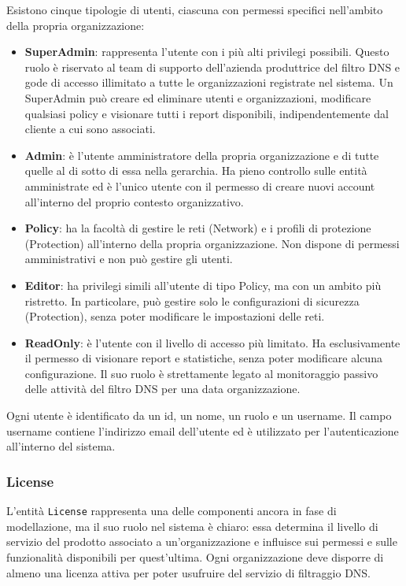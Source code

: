Esistono cinque tipologie di utenti, ciascuna con permessi specifici nell'ambito della propria organizzazione:
\begin{itemize}
  \item \textbf{SuperAdmin}: rappresenta l'utente con i più alti privilegi possibili. Questo ruolo è riservato al team di supporto dell'azienda produttrice del filtro DNS e gode di accesso illimitato a tutte le organizzazioni registrate nel sistema. Un SuperAdmin può creare ed eliminare utenti e organizzazioni, modificare qualsiasi policy e visionare tutti i report disponibili, indipendentemente dal cliente a cui sono associati.
  \item \textbf{Admin}: è l'utente amministratore della propria organizzazione e di tutte quelle al di sotto di essa nella gerarchia. Ha pieno controllo sulle entità amministrate ed è l'unico utente con il permesso di creare nuovi account all'interno del proprio contesto organizzativo.
  \item \textbf{Policy}: ha la facoltà di gestire le reti (Network) e i profili di protezione (Protection) all'interno della propria organizzazione. Non dispone di permessi amministrativi e non può gestire gli utenti.
  \item \textbf{Editor}: ha privilegi simili all'utente di tipo Policy, ma con un ambito più ristretto. In particolare, può gestire solo le configurazioni di sicurezza (Protection), senza poter modificare le impostazioni delle reti.
  \item \textbf{ReadOnly}: è l'utente con il livello di accesso più limitato. Ha esclusivamente il permesso di visionare report e statistiche, senza poter modificare alcuna configurazione. Il suo ruolo è strettamente legato al monitoraggio passivo delle attività del filtro DNS per una data organizzazione.
\end{itemize}

Ogni utente è identificato da un id, un nome, un ruolo e un username. Il campo username contiene l'indirizzo email dell'utente ed è utilizzato per l'autenticazione all'interno del sistema.

\subsubsection{License}
L'entità \texttt{License} rappresenta una delle componenti ancora in fase di modellazione, ma il suo ruolo nel sistema è chiaro: essa determina il livello di servizio del prodotto associato a un'organizzazione e influisce sui permessi e sulle funzionalità disponibili per quest’ultima. Ogni organizzazione deve disporre di almeno una licenza attiva per poter usufruire del servizio di filtraggio DNS.

